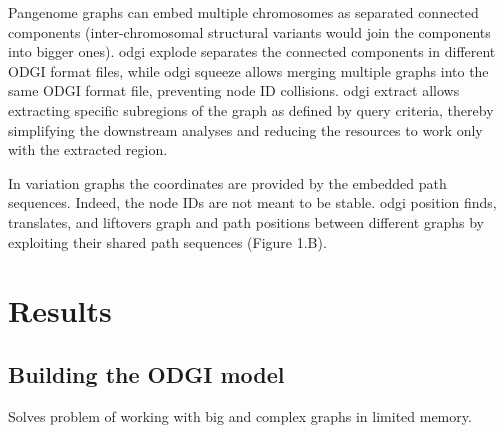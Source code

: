 \documentclass{bioinfo}
\begin{document}
Pangenome graphs can embed multiple chromosomes as separated connected components (inter-chromosomal structural variants would join the components into bigger ones).
odgi explode separates the connected components in different ODGI format files, while odgi squeeze allows merging multiple graphs into the same ODGI format file, preventing node ID collisions.
odgi extract allows extracting specific subregions of the graph as defined by query criteria, thereby simplifying the downstream analyses and reducing the resources to work only with the extracted region.

In variation graphs the coordinates are provided by the embedded path sequences.
Indeed, the node IDs are not meant to be stable. odgi position finds, translates, and liftovers graph and path positions between different graphs by exploiting their shared path sequences (Figure 1.B).

\begin{comment}
key message of the paper is that we have collected a set of algorithms that enable easy use of pangenome graphs for investigating biology
-> build model solves problem of working with big graphs in memory
-> view (convert to GFA) & paths solve problem of exporting basic features of the graph (e.g. paths)
-> stats (understand basic size / structure) & bin & degree & depth solves problem of understanding the overall structure and size of the graph
-> sort (groom) & layout solves problem of finding latent structure in the pangenome
-> viz & draw provides a human-viewable readout of the graph
-> chop & unchop & squeeze & break & prune & explode lets us break apart or combine the graph nodes and topology
-> position & tips & untangle (jaccard based coordinate conversion) provides a way to map coordinates between any genomes in the graph (e.g. liftover!)
-> extract lets us pull out specific regions of the graph based on path ranges, nodes and positions
\end{comment}

\section{Results}

\subsection{Building the \textsc{ODGI} model}


Solves problem of working with big and complex graphs in limited memory.
\end{document}
